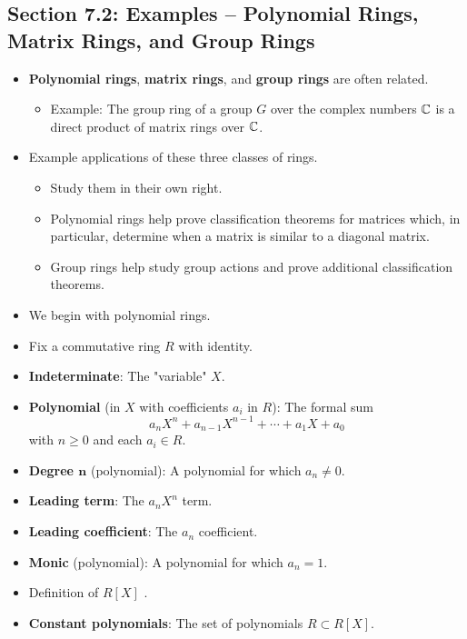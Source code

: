 \documentclass[../notes.tex]{subfiles}
\begin{document}
\subsection*{Section 7.2: Examples -- Polynomial Rings, Matrix Rings, and Group Rings}
\begin{itemize}
    \item \textbf{Polynomial rings}, \textbf{matrix rings}, and \textbf{group rings} are often related.
    \begin{itemize}
        \item Example: The group ring of a group $G$ over the complex numbers $\mathbb{C}$ is a direct product of matrix rings over $\mathbb{C}$.
    \end{itemize}
    \item Example applications of these three classes of rings.
    \begin{itemize}
        \item Study them in their own right.
        \item Polynomial rings help prove classification theorems for matrices which, in particular, determine when a matrix is similar to a diagonal matrix.
        \item Group rings help study group actions and prove additional classification theorems.
    \end{itemize}
    \item We begin with polynomial rings.
    \item Fix a commutative ring $R$ with identity.
    \item \textbf{Indeterminate}: The "variable" $X$.
    \item \textbf{Polynomial} (in $X$ with coefficients $a_i$ in $R$): The formal sum
    \begin{equation*}
        a_nX^n+a_{n-1}X^{n-1}+\cdots+a_1X+a_0
    \end{equation*}
    with $n\geq 0$ and each $a_i\in R$.
    \item \textbf{Degree $\bm{n}$} (polynomial): A polynomial for which $a_n\neq 0$.
    \item \textbf{Leading term}: The $a_nX^n$ term.
    \item \textbf{Leading coefficient}: The $a_n$ coefficient.
    \item \textbf{Monic} (polynomial): A polynomial for which $a_n=1$.
    \item Definition of $R[X]$ \parencite[234]{bib:DummitFoote}.
    \item \textbf{Constant polynomials}: The set of polynomials $R\subset R[X]$.

\end{itemize}
\end{document}

